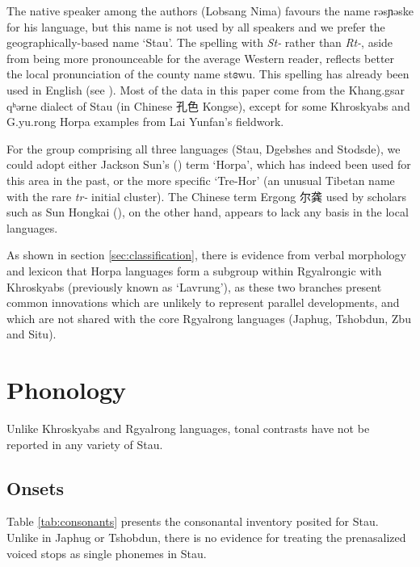 \documentclass[oneside,a4paper,11pt]{article}
\newcommand{\ipa}[1]{{\phon#1}} %
\newcommand{\zh}[1]{{\cn#1}}
\begin{document}
  The native speaker among the authors (Lobsang Nima) favours the name \ipa{rəsɲəske} for his language, but this name is not used by all speakers and we prefer the geographically-based name  `Stau'. The spelling with \textit{St-} rather than \textit{Rt-}, aside from being more pronounceable for the average Western reader, reflects better the local pronunciation of the county name \ipa{stɞwu}. This spelling has already been used in English (see \citealt{wang70stau}).   Most of the data in this paper come from the Khang.gsar \ipa{qʰərne} dialect of Stau (in Chinese \zh{孔色} Kongse), except for some Khroskyabs and G.yu.rong Horpa examples from Lai Yunfan's fieldwork.
  
For the group comprising all three languages (Stau, Dgebshes and Stodsde),  we could adopt either Jackson Sun's 
(\citeyear{jackson00sidaba}) term `Horpa', which has indeed been used for this area in the past, or the more specific `Tre-Hor' (an unusual Tibetan name with the rare \textit{tr-} initial cluster).  The Chinese term Ergong \zh{尔龚} used by scholars such as Sun Hongkai (\citeyear{sun83liujiang}), on the other hand, appears to lack any basis in the local languages.
 
As shown in section \ref{sec:classification}, there is evidence from verbal morphology and lexicon that Horpa languages form a subgroup within Rgyalrongic with Khroskyabs (previously known as `Lavrung'), as these two branches present common innovations which are unlikely to represent parallel developments, and which are not shared with the core Rgyalrong languages (Japhug, Tshobdun, Zbu and Situ).
 
\section{Phonology}
Unlike Khroskyabs and Rgyalrong languages, tonal contrasts have not be reported in any variety of Stau.
 
  \subsection{Onsets}
  Table \ref{tab:consonants} presents the consonantal inventory posited for Stau. Unlike in Japhug or Tshobdun, there is no evidence for treating the prenasalized voiced stops as single phonemes in Stau.
  
\end{document}
